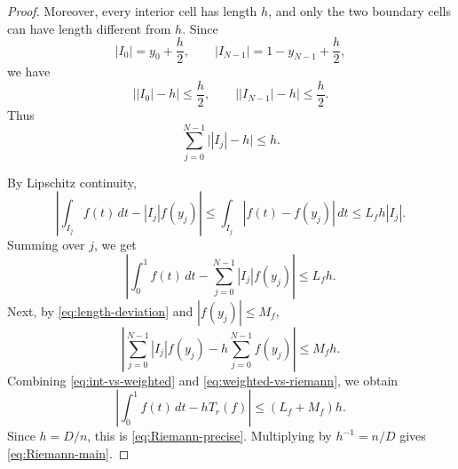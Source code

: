 \documentclass[10pt,a4paper]{amsart}
\begin{document}
\begin{proof}
Moreover, every interior cell has length \(h\), and only the two boundary
cells can have length different from \(h\).  Since
\[
|I_0|=y_0+\frac h2,
\qquad
|I_{N-1}|=1-y_{N-1}+\frac h2,
\]
we have
\[
\bigl||I_0|-h\bigr|
\le \frac h2,
\qquad
\bigl||I_{N-1}|-h\bigr|
\le \frac h2.
\]
Thus
\begin{equation}\label{eq:length-deviation}
\sum_{j=0}^{N-1}\bigl||I_j|-h\bigr|\le h.
\end{equation}

By Lipschitz continuity,
\[
\left|\int_{I_j}f(t)\,dt-|I_j|f(y_j)\right|
\le
\int_{I_j}|f(t)-f(y_j)|\,dt
\le
L_fh|I_j|.
\]
Summing over \(j\), we get
\begin{equation}\label{eq:int-vs-weighted}
\left|
\int_0^1 f(t)\,dt
-
\sum_{j=0}^{N-1}|I_j|f(y_j)
\right|
\le L_fh.
\end{equation}
Next, by \eqref{eq:length-deviation} and \(|f(y_j)|\le M_f\),
\begin{equation}\label{eq:weighted-vs-riemann}
\left|
\sum_{j=0}^{N-1}|I_j|f(y_j)
-
h\sum_{j=0}^{N-1}f(y_j)
\right|
\le M_fh.
\end{equation}
Combining \eqref{eq:int-vs-weighted} and \eqref{eq:weighted-vs-riemann}, we
obtain
\[
\left|\int_0^1 f(t)\,dt-hT_r(f)\right|
\le (L_f+M_f)h.
\]
Since \(h=D/n\), this is \eqref{eq:Riemann-precise}.  Multiplying by
\(h^{-1}=n/D\) gives \eqref{eq:Riemann-main}.
\end{proof}
\end{document}
